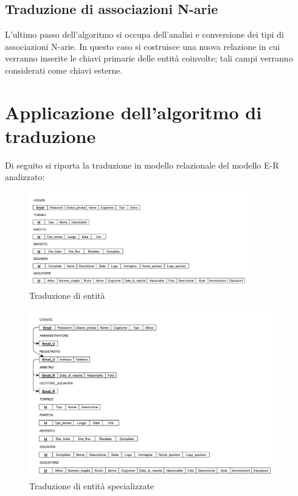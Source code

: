 \subsection{Traduzione di associazioni N-arie}
	L'ultimo passo dell'algoritmo si occupa dell'analisi e conversione dei tipi di associazioni N-arie. In questo caso si costruisce una nuova relazione in cui verranno inserite le chiavi primarie delle entità coinvolte; tali campi verranno considerati come chiavi esterne.

\section{Applicazione dell'algoritmo di traduzione}
	Di seguito si riporta la traduzione in modello relazionale del modello E-R analizzato:
	
	\begin{figure}[h]
		\centering
		\includegraphics[width=0.85\textwidth]
		{immagini/traduzione-entita}
		
		\caption{Traduzione di entità}
	\end{figure}
	
	\begin{figure}[h]
		\centering
		\includegraphics[width=0.95\textwidth]
		{immagini/traduzione-entita-specializzate}
		
		\caption{Traduzione di entità specializzate}
	\end{figure}
	
